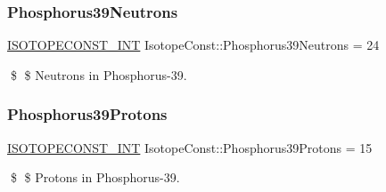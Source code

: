 \subsubsection{\texorpdfstring{Phosphorus39\+Neutrons}{Phosphorus39Neutrons}}
{\footnotesize\ttfamily \mbox{\hyperlink{group___isotope_const-_macros_ga5f18360b3e99483a35c32d789e62621c}{I\+S\+O\+T\+O\+P\+E\+C\+O\+N\+S\+T\+\_\+\+I\+NT}} Isotope\+Const\+::\+Phosphorus39\+Neutrons = 24}

\$ \$ Neutrons in Phosphorus-\/39. \mbox{\label{group___isotope_const-_phosphorus-_p39_ga99b6e3ddf901b2af808fcbdea6e00a1e}} 
\subsubsection{\texorpdfstring{Phosphorus39\+Protons}{Phosphorus39Protons}}
{\footnotesize\ttfamily \mbox{\hyperlink{group___isotope_const-_macros_ga5f18360b3e99483a35c32d789e62621c}{I\+S\+O\+T\+O\+P\+E\+C\+O\+N\+S\+T\+\_\+\+I\+NT}} Isotope\+Const\+::\+Phosphorus39\+Protons = 15}

\$ \$ Protons in Phosphorus-\/39. 